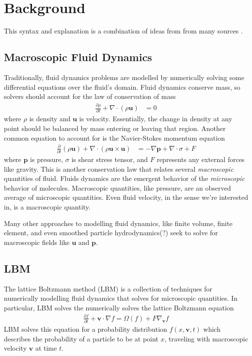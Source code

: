 \section{Background}\label{sec:relatedwork}

This syntax and explanation is a combination of ideas from from many sources \cite{Lyu2021,Li2020,Mei2006,Yu2005,Kruger2018}.

\subsection{Macroscopic Fluid Dynamics}

Traditionally, fluid dynamics problems are 
modelled by numerically solving some 
differential equations over the fluid's domain.
Fluid dynamics conserve mass, so solvers should account for the law of conservation of mass
\begin{align}
  \frac{\partial \rho}{\partial t} + \nabla \cdot (\rho \bm{u}) &= 0
\end{align}
where $\rho$ is density and $\bm{u}$ is velocity. 
Essentially, the change in density at any point should be 
balanced by mass entering or leaving that region.
Another common equation to account for is the Navier-Stokes momentum equation
\begin{align}
\frac{\partial}{\partial t} (\rho \bm{u}) 
+ \nabla \cdot (\rho \bm{u} \times \bm{u}) &= 
- \nabla \bm{p} + \nabla \cdot \sigma + F
\end{align}
where $\bm{p}$ is pressure, $\sigma$ is shear stress tensor, and $F$
represents any external forces like gravity. 
This is another conservation law that relates several \textit{macroscopic}
quantities of fluid.
Fluids dynamics are the emergent behavior of the \textit{microscopic} 
behavior of molecules.
Macroscopic quantities, like pressure, are an observed average of 
microscopic quantities.
Even fluid velocity, in the sense we're interested in, 
is a macroscopic quantity.

Many other approaches to modelling fluid dynamics,
like finite volume, finite element, and even 
smoothed particle hydrodynamics(?)
seek to solve for macroscopic 
fields like $\bm{u}$ and $\bm{p}$.

\subsection{LBM}
The lattice Boltzmann method (LBM) is a collection of techniques for
numerically modelling fluid dynamics that solves for microscopic quantities.
In particular, LBM solves the numerically solves 
the lattice Boltzmann equation
\begin{align}\label{eqn:cont_lbm}
  \frac{\partial f}{\partial t} + \bm{v} \cdot \nabla f = \Omega(f) + F\nabla_{\bm{v}} f
\end{align}
LBM solves this equation for a probability distribution $f(x, \bm{v}, t)$ which
describes the probability of a particle to be at point $x$, traveling with macroscopic velocity $\bm{v}$ at time $t$.

